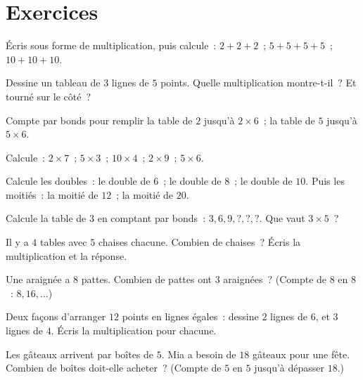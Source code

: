 \section{Exercices}

\begin{exercise}[$\star$]\label{exo:g2:mult:1}
Écris sous forme de multiplication, puis calcule~:
$2 + 2 + 2$~; \quad $5 + 5 + 5 + 5$~; \quad $10 + 10 + 10$.
\end{exercise}

\begin{exercise}[$\star$]\label{exo:g2:mult:2}
Dessine un tableau de $3$ lignes de $5$ points. Quelle multiplication
montre-t-il~? Et tourné sur le côté~?
\end{exercise}

\begin{exercise}[$\star$]\label{exo:g2:mult:3}
Compte par bonds pour remplir la table de $2$ jusqu'à
$2 \times 6$~; la table de $5$ jusqu'à $5 \times 6$.
\end{exercise}

\begin{exercise}[$\star$]\label{exo:g2:mult:4}
Calcule~: $2 \times 7$~; \quad $5 \times 3$~; \quad
$10 \times 4$~; \quad $2 \times 9$~; \quad $5 \times 6$.
\end{exercise}

\begin{exercise}[$\star$]\label{exo:g2:mult:5}
Calcule les doubles~: le double de $6$~; le double de $8$~; le
double de $10$. Puis les moitiés~: la moitié de $12$~; la
moitié de $20$.
\end{exercise}

\begin{exercise}[$\star$]\label{exo:g2:mult:6}
Calcule la table de $3$ en comptant par bonds~: $3, 6, 9, ?, ?, ?$.
Que vaut $3 \times 5$~?
\end{exercise}

\begin{exercise}[$\star$]\label{exo:g2:mult:7}
\guillemotleft{} Il y a $4$ tables avec $5$ chaises chacune. Combien
de chaises~? \guillemotright{} Écris la multiplication et la
réponse.
\end{exercise}

\begin{exercise}[$\star$]\label{exo:g2:mult:8}
Une araignée a $8$ pattes. Combien de pattes ont $3$ araignées~?
(Compte de $8$ en $8$~: $8, 16, \dots$)
\end{exercise}

\begin{exercise}[$\star$]\label{exo:g2:mult:9}
Deux façons d'arranger $12$ points en lignes égales~: dessine
$2$ lignes de $6$, et $3$ lignes de $4$. Écris la multiplication
pour chacune.
\end{exercise}

\begin{exercise}[$\star\star$]\label{exo:g2:mult:10}
Les gâteaux arrivent par boîtes de $5$. Mia a besoin de $18$
gâteaux pour une fête. Combien de boîtes doit-elle acheter~?
(Compte de $5$ en $5$ jusqu'à dépasser $18$.)
\end{exercise}
